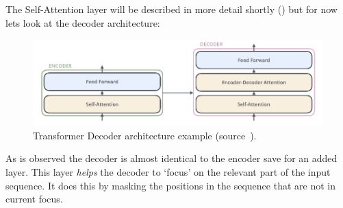 The Self-Attention layer will be described in more detail shortly () but for now lets look at the decoder architecture:
\begin{figure}[H]
	\centering
	\includegraphics[width=1\linewidth]{figures/decoder_archi_1.png}
	\caption{Transformer Decoder architecture example (source~\autocite{alammarIllustratedTransformer}).}
	\label{fig:transformer_decoder}
\end{figure}
As is observed the decoder is almost identical to the encoder save for an added  layer. This layer
\emph{helps} the decoder to `focus' on the relevant part of the input sequence. It does this by masking the positions in the sequence
that are not in current focus.
